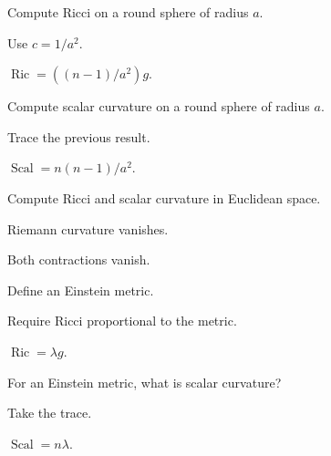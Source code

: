 \begin{exercise}\label{exr:vii27-13}
Compute Ricci on a round sphere of radius \(a\).
\end{exercise}
\begin{hint}
Use \(c=1/a^2\).
\end{hint}
\begin{solution}
\(\operatorname{Ric}=((n-1)/a^2)g\).
\end{solution}

\begin{exercise}\label{exr:vii27-14}
Compute scalar curvature on a round sphere of radius \(a\).
\end{exercise}
\begin{hint}
Trace the previous result.
\end{hint}
\begin{solution}
\(\operatorname{Scal}=n(n-1)/a^2\).
\end{solution}

\begin{exercise}\label{exr:vii27-15}
Compute Ricci and scalar curvature in Euclidean space.
\end{exercise}
\begin{hint}
Riemann curvature vanishes.
\end{hint}
\begin{solution}
Both contractions vanish.
\end{solution}

\begin{exercise}\label{exr:vii27-16}
Define an Einstein metric.
\end{exercise}
\begin{hint}
Require Ricci proportional to the metric.
\end{hint}
\begin{solution}
\(\operatorname{Ric}=\lambda g\).
\end{solution}

\begin{exercise}\label{exr:vii27-17}
For an Einstein metric, what is scalar curvature?
\end{exercise}
\begin{hint}
Take the trace.
\end{hint}
\begin{solution}
\(\operatorname{Scal}=n\lambda\).
\end{solution}


